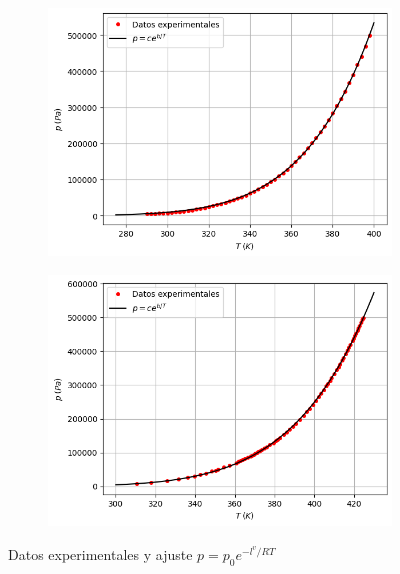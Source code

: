 \documentclass[a4paper,12pt,titlepage]{article}
\begin{document}
\newpage

\begin{figure}[h!]
    \centering
    \begin{subfigure}{0.49\textwidth}
        \centering
        \includegraphics[width=1.02\linewidth]{ELV simple/curva_c_oh.png}
    \end{subfigure}
    \begin{subfigure}{0.49\textwidth}
        \centering
        \includegraphics[width=1.02\linewidth]{ELV simple/curva_c_agua.png}
    \end{subfigure}
    \caption{Datos experimentales y ajuste $p=p_0e^{-l^v/RT}$}
    \label{fig:enter-label}
\end{figure}
\end{document}
